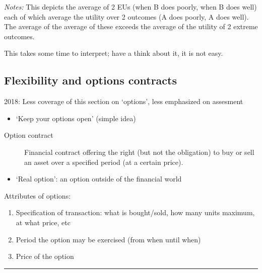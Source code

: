 \documentclass[]{article}
\providecommand{\tightlist}{%
  \setlength{\itemsep}{0pt}\setlength{\parskip}{0pt}}
\begin{document}
\emph{Notes:}
This depicts the average of 2 EUs (when B does poorly, when B does well)
each of which average the utility over 2 outcomes (A does poorly, A does well).
The average of the average of these exceeds the average of the utility of 2 extreme outcomes.

This takes some time to interpret; have a think about it, it is not easy.

\hypertarget{flexibility-and-options-contracts}{%
\subsection{Flexibility and options contracts}\label{flexibility-and-options-contracts}}

2018: Less coverage of this section on `options', less emphasized on assesment

\begin{itemize}
\tightlist
\item
  `Keep your options open' (simple idea)
\end{itemize}

\bigskip

\begin{description}
\item[Option contract]
Financial contract offering the right (but not the obligation) to buy or sell an asset over a specified period (at a certain price).
\end{description}

\begin{itemize}
\tightlist
\item
  `Real option': an option outside of the financial world
\end{itemize}

\bigskip

Attributes of options:

\begin{enumerate}
\def\labelenumi{\arabic{enumi}.}
\tightlist
\item
  Specification of transaction: what is bought/sold, how many units maximum, at what price, etc
\item
  Period the option may be exercised (from when until when)
\item
  Price of the option
\end{enumerate}

\begin{center}\rule{0.5\linewidth}{\linethickness}\end{center}
\end{document}
